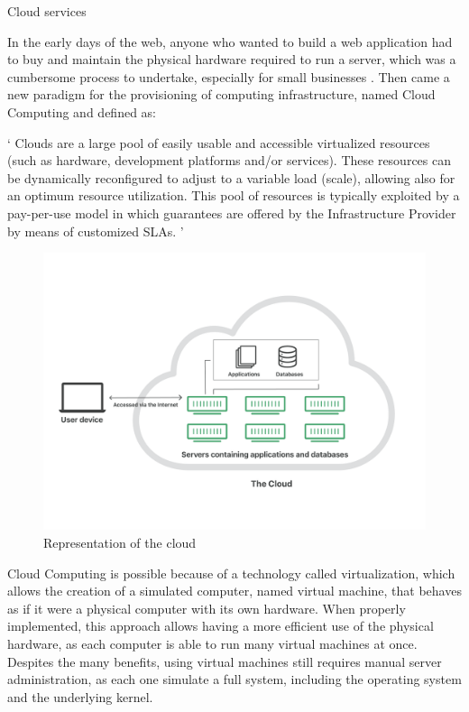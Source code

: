 \begin{chapter}{Cloud services}
    \label{chap:cloud_services}

    In the early days of the web, anyone who wanted to build a web application had
    to buy and maintain the physical hardware required to run a server, which was
    a cumbersome process to undertake, especially for small businesses
    \cite{what_is_sls_cloudflare}.
    Then came a new paradigm for the provisioning of computing infrastructure, named
    Cloud Computing and defined as:

    \enquote*{%
        Clouds are a large pool of easily usable and accessible virtualized resources
        (such as hardware, development platforms and/or services). These resources
        can be dynamically reconﬁgured to adjust to a variable load (scale), allowing
        also for an optimum resource utilization. This pool of resources is typically
        exploited by a pay-per-use model in which guarantees are offered by the
        Infrastructure Provider by means of customized SLAs.%
    } \cite{cloud_computing_definition}

    \begin{figure}
        \centering
        \includegraphics[width=12cm]{source/images/what-is-the-cloud.png}
        \caption{Representation of the cloud}
    \end{figure}

    Cloud Computing is possible because of a technology called virtualization, which
    allows the creation of a simulated computer, named virtual machine, that behaves
    as if it were a physical computer with its own hardware. When properly implemented,
    this approach allows having a more efficient use of the physical hardware, as
    each computer is able to run many virtual machines at once.
    Despites the many benefits, using virtual machines still requires manual server
    administration, as each one simulate a full system, including the operating
    system and the underlying kernel.


\end{chapter}
